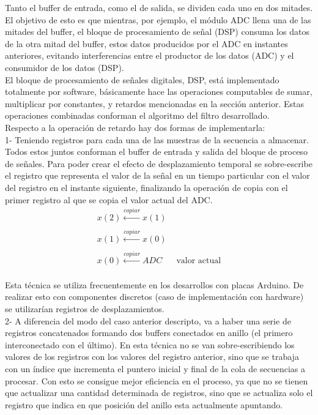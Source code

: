 \documentclass[informe.tex]{subfiles}
\begin{document}
Tanto el buffer de entrada, como el de salida, se dividen cada uno en dos mitades. El objetivo de esto es que mientras, por ejemplo, el módulo ADC llena una de las mitades del buffer, el bloque de procesamiento de señal (DSP) consuma los datos de la otra mitad del buffer, estos datos producidos por el ADC en instantes anteriores, evitando interferencias entre el productor de los datos (ADC) y el consumidor de los datos (DSP).\\

El bloque de procesamiento de señales digitales, DSP, está implementado totalmente por software, básicamente hace las operaciones computables de sumar, multiplicar por constantes, y retardos mencionadas en la sección anterior. Estas operaciones combinadas conforman el algoritmo del filtro desarrollado.\\

Respecto a la operación de retardo hay dos formas de implementarla:\\

1- Teniendo registros para cada una de las muestras de la secuencia a almacenar. Todos estos juntos conforman el buffer de entrada y salida del bloque de proceso de señales. Para poder crear el efecto de desplazamiento temporal se sobre-escribe el registro que representa el valor de la señal en un tiempo particular con el valor del registro en el instante siguiente, finalizando la operación de copia con el primer registro al que se copia el valor actual del ADC.
	$$
		\begin{matrix}
			x(2) \xleftarrow[]{ copiar } x(1)& \\
 			x(1) \xleftarrow[]{ copiar } x(0)& \\
 			x(0) \xleftarrow[]{ copiar } ADC & \mbox{ valor actual}
		\end{matrix}
	$$

Esta técnica se utiliza frecuentemente en los desarrollos con placas Arduino. De realizar esto con componentes discretos (caso de implementación con hardware) se utilizarían registros de desplazamientos.\\

2- A diferencia del modo del caso anterior descripto, va a haber una serie de registros concatenados formando dos buffers conectados en anillo (el primero interconectado con el último). En esta técnica no se van sobre-escribiendo los valores de los registros con los valores del registro anterior, sino que se trabaja con un índice que incrementa el puntero inicial y final de la cola de secuencias a procesar.  Con esto se consigue mejor eficiencia en el proceso, ya que no se tienen que actualizar una cantidad determinada de registros, sino que se actualiza solo el registro que indica en que posición del anillo esta actualmente apuntando.\\
\end{document}
